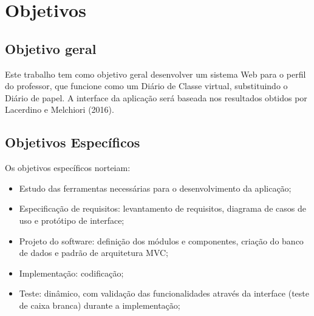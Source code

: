 \section{Objetivos}


\subsection{Objetivo geral}

Este trabalho tem como objetivo geral desenvolver um sistema Web para o perfil do professor, que funcione como um Diário de Classe virtual, substituindo o Diário de papel. A interface da aplicação será baseada nos resultados obtidos por Lacerdino e Melchiori (2016).


\subsection{Objetivos Específicos}


Os objetivos específicos norteiam: 

\begin{itemize}
	\item Estudo das ferramentas necessárias para o desenvolvimento da aplicação;
	\item Especificação de requisitos: levantamento de requisitos, diagrama de casos de uso e protótipo de interface;
	\item Projeto do software: definição dos módulos e componentes, criação do banco de dados e padrão de arquitetura MVC;
	\item Implementação: codificação;
	\item Teste: dinâmico, com validação das funcionalidades através da interface (teste de caixa branca) durante a implementação;
	
\end{itemize}












